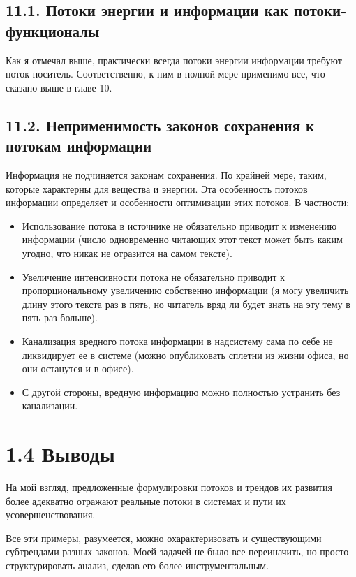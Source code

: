 \documentclass[a4paper,11pt]{article}
\begin{document}
\subsection{11.1.  Потоки энергии и информации как потоки-функционалы}

Как я отмечал выше, практически всегда потоки энергии информации требуют
поток-носитель. Соответственно, к ним в полной мере применимо все, что сказано
выше в главе 10.

\subsection{11.2.  Неприменимость законов сохранения к потокам информации}

Информация не подчиняется законам сохранения. По крайней мере, таким, которые
характерны для вещества и энергии. Эта особенность потоков информации
определяет и особенности оптимизации этих потоков. В частности:
\begin{itemize}
\item Использование потока в источнике не обязательно приводит к изменению
  информации (число одновременно читающих этот текст может быть каким угодно,
  что никак не отразится на самом тексте).
\item Увеличение интенсивности потока не обязательно приводит к
  пропорциональному увеличению собственно информации (я могу увеличить длину
  этого текста раз в пять, но читатель вряд ли будет знать на эту тему в пять
  раз больше).
\item Канализация вредного потока информации в надсистему сама по себе не
  ликвидирует ее в системе (можно опубликовать сплетни из жизни офиса, но они
  останутся и в офисе).
\item С другой стороны, вредную информацию можно полностью устранить без
  канализации.
\end{itemize}

\section{1.4 Выводы}

На мой взгляд, предложенные формулировки потоков и трендов их развития более
адекватно отражают реальные потоки в системах и пути их усовершенствования.

Все эти примеры, разумеется, можно охарактеризовать и существующими
субтрендами разных законов. Моей задачей не было все переиначить, но просто
структурировать анализ, сделав его более инструментальным.
\end{document}
